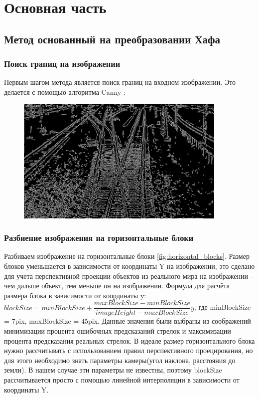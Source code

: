 \chapter{Основная часть}
\section{Метод основанный на преобразовании Хафа}
\subsection{Поиск границ на изображении}
Первым шагом метода является поиск границ на входном изображении. Это делается с помощью алгоритма Canny \cite{b:canny}:
\begin{figure}[!h]
	\centering
	\includegraphics[width=0.9\textwidth]{pictures/canny_res}
	\caption[Применение алгоритма Canny]{}
	\label{fig:cannyres}
\end{figure}

\subsection{Разбиение изображения на горизонтальные блоки}
Разбиваем изображение на горизонтальные блоки \ref{fig:horizontal_blocks}. Размер блоков уменьшается в зависимости от координаты Y на изображении, это сделано для учета перспективной проекции объектов из реального мира на изображении - чем дальше объект, тем меньше он на изображении.
\newline
Формула для расчёта размера блока в зависимости от координаты y:
\newline
$blockSize = minBlockSize + \dfrac{maxBlockSize - minBlockSize}{imageHeight - maxBlockSize}y$, где  minBlockSize = 7pix, maxBlockSize = 45pix. Данные значения были выбраны из соображений минимизации процента ошибочных предсказаний стрелок и максимизации процента предсказания реальных стрелок.
В идеале размер горизонтального блока нужно рассчитывать с использованием правил перспективного проецирования\cite{b:projection}, но для этого необходимо знать параметры камеры(угол наклона, расстояния до земли).
В нашем случае эти параметры не известны, поэтому blockSize рассчитывается просто с помощью линейной интерполяции в зависимости от координаты Y.

